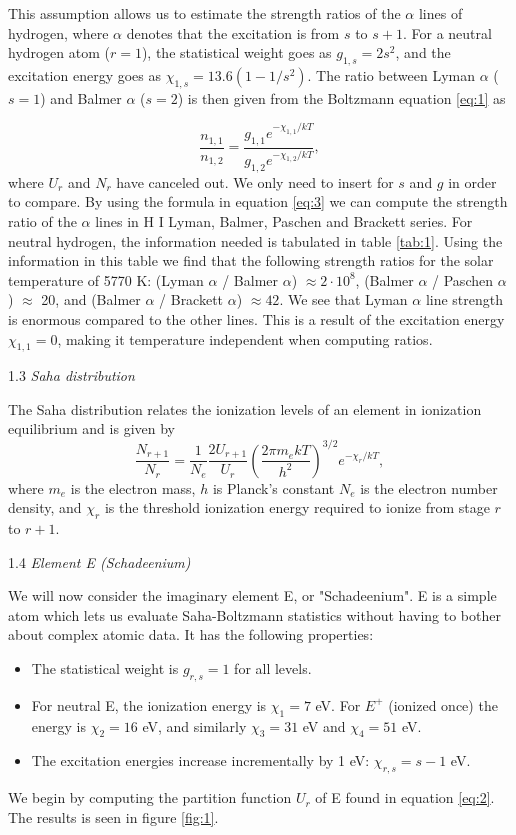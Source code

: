 \documentclass[a4paper,11.5pt,]{article}
\begin{document}
\begin{multicols}{2}
This assumption allows us to estimate the strength ratios of the $\alpha$ lines of hydrogen, where $\alpha$ denotes that the excitation is from $s$ to $s+1$.  For a neutral hydrogen atom ($r = 1$), the statistical weight goes as $g_{1,s} = 2s^2$, and the excitation energy goes as $\chi_{1,s} = 13.6 (1- 1/s^2)$. The ratio between Lyman $\alpha$ ($s=1$) and Balmer $\alpha$ ($s=2$) is then given from the Boltzmann equation \eqref{eq:1} as

\begin{equation}\label{eq:3}
    \frac{n_{1,1}}{n_{1,2}} = \frac{g_{1,1}e^{-\chi_{1,1}/kT}}{g_{1,2} e^{-\chi_{1,2}/kT}},
\end{equation}
where $U_r$ and $N_r$ have canceled out. We only need to insert for $s$ and $g$ in order to compare. By using the formula in equation \eqref{eq:3} we can compute the strength ratio of the $\alpha$ lines in H I Lyman, Balmer, Paschen and Brackett series. For neutral hydrogen, the information needed is tabulated in table \ref{tab:1}. Using the information in this table we find that the following strength ratios for the solar temperature of 5770 K: (Lyman $\alpha$ / Balmer $\alpha$) $\approx 2 \cdot 10^8$, (Balmer $\alpha$ / Paschen $\alpha$) $\approx $ 20, and (Balmer $\alpha$ / Brackett $\alpha$) $\approx 42$. We see that Lyman $\alpha$ line strength is enormous compared to the other lines. This is a result of the excitation energy $\chi_{1,1} = 0$, making it temperature independent when computing ratios.

\begin{center}
1.3\textit{ Saha distribution}
\end{center}
The Saha distribution relates the ionization levels of an element in ionization equilibrium and is given by
\begin{equation}\label{eq:4}
    \frac{N_{r+1}}{N_r} = \frac{1}{N_e} \frac{2U_{r+1}}{U_r} \left( \frac{2\pi m_e k T}{h^2} \right)^{3/2} e^{-\chi_r /kT},
\end{equation}
where $m_e$ is the electron mass, $h$ is Planck's constant $N_e$ is the electron number density, and $\chi_r$ is the threshold ionization energy required to ionize from stage $r$ to $r+1$.
\begin{center}
1.4\textit{ Element E (Schadeenium)}
\end{center}
We will now consider the imaginary element E, or "Schadeenium". E is a simple atom which lets us evaluate Saha-Boltzmann statistics without having to bother about complex atomic data. It has the following properties:
\begin{itemize}
    \item The statistical weight is $g_{r,s} = 1$ for all levels.
    \item For neutral E, the ionization energy is $\chi_1 = 7$ eV. For $E^+$ (ionized once) the energy is $\chi_2 = 16$ eV, and similarly $\chi_3 = 31$ eV and $\chi_4 = 51$ eV.
    \item The excitation energies increase incrementally by 1 eV: $\chi_{r,s} = s-1$ eV.
\end{itemize}
\noindent We begin by computing the partition function $U_r$ of E found in equation \eqref{eq:2}. The results is seen in figure \ref{fig:1}.


\end{multicols}
\end{document}
